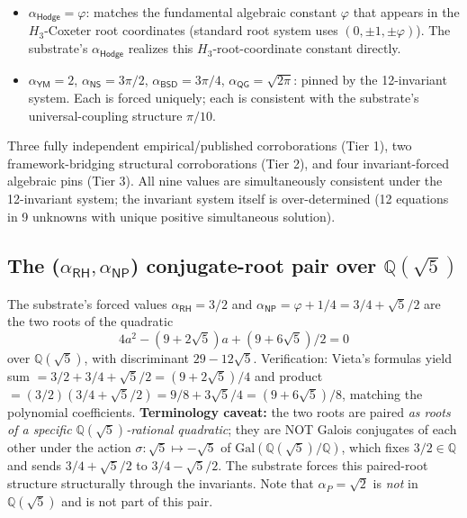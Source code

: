 \documentclass[11pt,a4paper]{amsart}
\theoremstyle{plain}
\theoremstyle{definition}
\begin{document}
\begin{description}[font=\normalfont\bfseries,leftmargin=2em,itemsep=4pt]
\begin{itemize}[itemsep=2pt,leftmargin=2em]
\item $\alpha_{\textsf{Hodge}} = \varphi$: matches the fundamental algebraic constant $\varphi$ that appears in the $H_3$-Coxeter root coordinates (standard root system uses $(0, \pm 1, \pm \varphi)$). The substrate's $\alpha_{\textsf{Hodge}}$ realizes this $H_3$-root-coordinate constant directly.
\end{itemize}
\item[Tier 3 — Algebraically forced by the invariant system.]
\begin{itemize}[itemsep=2pt,leftmargin=2em]
\item $\alpha_{\textsf{YM}} = 2$, $\alpha_{\textsf{NS}} = 3\pi/2$, $\alpha_{\textsf{BSD}} = 3\pi/4$, $\alpha_{\textsf{QG}} = \sqrt{2\pi}$: pinned by the 12-invariant system. Each is forced uniquely; each is consistent with the substrate's universal-coupling structure $\pi/10$.
\end{itemize}
\end{description}

Three fully independent empirical/published corroborations (Tier 1), two framework-bridging structural corroborations (Tier 2), and four invariant-forced algebraic pins (Tier 3). All nine values are simultaneously consistent under the 12-invariant system; the invariant system itself is over-determined (12 equations in 9 unknowns with unique positive simultaneous solution).

\subsection{The (\texorpdfstring{$\alpha_{\textsf{RH}}, \alpha_{\textsf{NP}}$}{alpha\_RH, alpha\_NP}) conjugate-root pair over \texorpdfstring{$\mathbb{Q}(\sqrt{5})$}{Q(sqrt(5))}}\label{subsec:galois-pair-corrected}

The substrate's forced values $\alpha_{\textsf{RH}} = 3/2$ and $\alpha_{\textsf{NP}} = \varphi + 1/4 = 3/4 + \sqrt{5}/2$ are the two roots of the quadratic
\[
4a^2 - (9 + 2\sqrt{5})a + (9 + 6\sqrt{5})/2 = 0
\]
over $\mathbb{Q}(\sqrt{5})$, with discriminant $29 - 12\sqrt{5}$. Verification: Vieta's formulas yield sum $= 3/2 + 3/4 + \sqrt{5}/2 = (9 + 2\sqrt{5})/4$ and product $= (3/2)(3/4 + \sqrt{5}/2) = 9/8 + 3\sqrt{5}/4 = (9 + 6\sqrt{5})/8$, matching the polynomial coefficients. \textbf{Terminology caveat:} the two roots are paired \emph{as roots of a specific $\mathbb{Q}(\sqrt{5})$-rational quadratic}; they are NOT Galois conjugates of each other under the action $\sigma: \sqrt{5} \mapsto -\sqrt{5}$ of $\mathrm{Gal}(\mathbb{Q}(\sqrt{5})/\mathbb{Q})$, which fixes $3/2 \in \mathbb{Q}$ and sends $3/4 + \sqrt{5}/2$ to $3/4 - \sqrt{5}/2$. The substrate forces this paired-root structure structurally through the invariants. Note that $\alpha_{P} = \sqrt{2}$ is \emph{not} in $\mathbb{Q}(\sqrt{5})$ and is not part of this pair.
\end{document}

